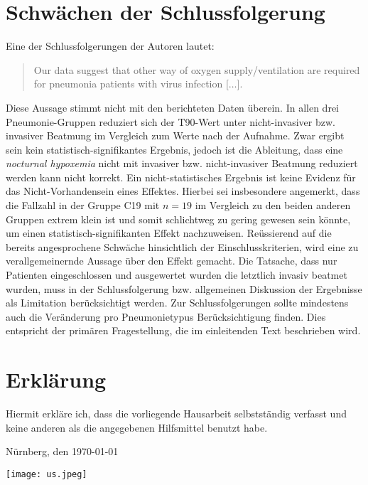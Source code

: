 \documentclass{scrartcl}
\theoremstyle{definition}
\theoremstyle{remark}
\begin{document}
\section{Schwächen der Schlussfolgerung}
Eine der Schlussfolgerungen der Autoren lautet:
		\begin{quotation}
		\noindent Our data suggest that other way of oxygen supply/ventilation are required for pneumonia patients with virus infection [$\ldots$].
	\end{quotation}
 Diese Aussage stimmt nicht mit den berichteten Daten überein. In allen drei Pneumonie-Gruppen reduziert sich der T90-Wert unter nicht-invasiver bzw. invasiver Beatmung im Vergleich zum Werte nach der Aufnahme. Zwar ergibt sein kein statistisch-signifikantes Ergebnis, jedoch ist die Ableitung, dass eine \textit{nocturnal hypoxemia} nicht mit invasiver bzw. nicht-invasiver Beatmung reduziert werden kann nicht korrekt. Ein nicht-statistisches Ergebnis ist keine Evidenz für das Nicht-Vorhandensein eines Effektes. Hierbei sei insbesondere angemerkt, dass die Fallzahl in der Gruppe C19 mit $n=19$ im Vergleich zu den beiden anderen Gruppen extrem klein ist und somit schlichtweg zu gering gewesen sein könnte, um einen statistisch-signifikanten Effekt nachzuweisen.
Reüssierend auf die bereits angesprochene Schwäche hinsichtlich der Einschlusskriterien, wird eine zu verallgemeinernde Aussage über den Effekt gemacht. Die Tatsache, dass nur Patienten eingeschlossen und ausgewertet wurden die letztlich invasiv beatmet wurden, muss in der Schlussfolgerung bzw. allgemeinen Diskussion der Ergebnisse als Limitation berücksichtigt werden. 
Zur Schlussfolgerungen sollte mindestens auch die Veränderung pro Pneumonietypus Berücksichtigung finden. Dies entspricht der primären Fragestellung, die im einleitenden Text beschrieben wird. 


\newpage
\section{Erklärung}
Hiermit erkläre ich, dass die vorliegende Hausarbeit selbstständig verfasst und keine anderen als die angegebenen Hilfsmittel benutzt habe.



Nürnberg, den \today

\texttt{[image: us.jpeg]}







%

%
%

\end{document}
